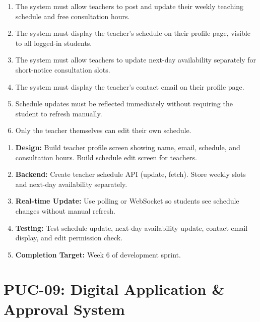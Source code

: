 \documentclass[12pt,a4paper]{article}
\begin{document}
\begin{tcolorbox}[frbox, title={Functional Requirements --- PUC-08}]
\begin{enumerate}[leftmargin=*, label=\textbf{FR-08.\arabic*}, itemsep=5pt]
  \item The system must allow teachers to post and update their weekly teaching schedule and free consultation hours.
  \item The system must display the teacher's schedule on their profile page, visible to all logged-in students.
  \item The system must allow teachers to update next-day availability separately for short-notice consultation slots.
  \item The system must display the teacher's contact email on their profile page.
  \item Schedule updates must be reflected immediately without requiring the student to refresh manually.
  \item Only the teacher themselves can edit their own schedule.
\end{enumerate}
\end{tcolorbox}

\begin{tcolorbox}[planbox, title={Completion Plan --- PUC-08}]
\begin{enumerate}[leftmargin=*, label=\textbf{Step \arabic*:}, itemsep=4pt]
  \item \textbf{Design:} Build teacher profile screen showing name, email, schedule, and consultation hours. Build schedule edit screen for teachers.
  \item \textbf{Backend:} Create teacher schedule API (update, fetch). Store weekly slots and next-day availability separately.
  \item \textbf{Real-time Update:} Use polling or WebSocket so students see schedule changes without manual refresh.
  \item \textbf{Testing:} Test schedule update, next-day availability update, contact email display, and edit permission check.
  \item \textbf{Completion Target:} Week 6 of development sprint.
\end{enumerate}
\end{tcolorbox}

\newpage
\section{PUC-09: Digital Application \& Approval System}
\end{document}
